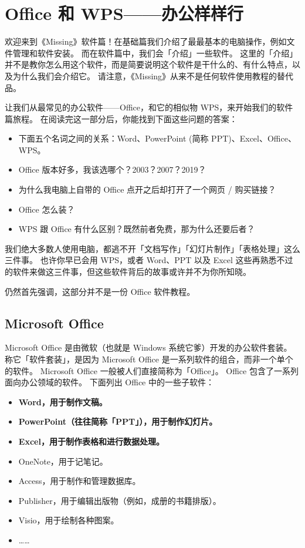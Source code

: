 \chapter{Office 和 WPS——办公样样行}

\begin{note}
  欢迎来到《Missing》软件篇！在基础篇我们介绍了最最基本的电脑操作，例如文件管理和软件安装。
  而在软件篇中，我们会「介绍」一些软件。
  这里的「介绍」并不是教你怎么用这个软件，而是简要说明这个软件是干什么的、有什么特点，以及为什么我们会介绍它。
  请注意，《Missing》从来不是任何软件使用教程的替代品。
\end{note}

\begin{intro}
  让我们从最常见的办公软件——Office，和它的相似物 WPS，来开始我们的软件篇旅程。
  在阅读完这一部分后，你能找到下面这些问题的答案：
  \begin{itemize}
    \item 下面五个名词之间的关系：Word、PowerPoint (简称 PPT)、Excel、Office、WPS。
    \item Office 版本好多，我该选哪个？2003？2007？2019？
    \item 为什么我电脑上自带的 Office 点开之后却打开了一个网页 / 购买链接？
    \item Office 怎么装？
    \item WPS 跟 Office 有什么区别？既然前者免费，那为什么还要后者？
  \end{itemize}
\end{intro}

我们绝大多数人使用电脑，都逃不开「文档写作」「幻灯片制作」「表格处理」这么三件事。
也许你早已会用 WPS，或者 Word、PPT 以及 Excel 这些再熟悉不过的软件来做这三件事，但这些软件背后的故事或许并不为你所知晓。

仍然首先强调，这部分并不是一份 Office 软件教程。

\section{Microsoft Office}

Microsoft Office 是由微软（也就是 Windows 系统它爹）开发的办公软件套装。
称它「软件套装」，是因为 Microsoft Office 是一系列软件的组合，而非一个单个的软件。
Microsoft Office 一般被人们直接简称为「Office」。
Office 包含了一系列面向办公领域的软件。
下面列出 Office 中的一些子软件：

\begin{itemize}
  \item \textbf{Word，用于制作文稿。}
  \item \textbf{PowerPoint（往往简称「PPT」），用于制作幻灯片。}
  \item \textbf{Excel，用于制作表格和进行数据处理。}
  \item OneNote，用于记笔记。
  \item Access，用于制作和管理数据库。
  \item Publisher，用于编辑出版物（例如，成册的书籍排版）。
  \item Visio，用于绘制各种图案。
  \item ……
\end{itemize}

